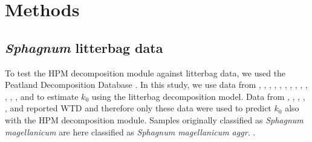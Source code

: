 \documentclass[esd, manuscript]{copernicus}
\begin{document}
\hypertarget{sdm-003-methods}{%
\section{Methods}\label{sdm-003-methods}}

\hypertarget{sdm-003-methods-1}{%
\subsection{\texorpdfstring{\emph{Sphagnum} litterbag data}{Sphagnum litterbag data}}\label{sdm-003-methods-1}}

To test the HPM decomposition module against litterbag data, we used the Peatland Decomposition Database \citep{Teickner.2024c}. In this study, we use data from \citet{Bartsch.1985}, \citet{Vitt.1990}, \citet{Johnson.1991}, \citet{Szumigalski.1996}, \citet{Prevost.1997}, \citet{Scheffer.2001}, \citet{Thormann.2001}, \citet{Asada.2005b}, \citet{Trinder.2008}, \citet{Breeuwer.2008}, \citet{Strakova.2010}, \citet{Hagemann.2015}, \citet{Golovatskaya.2017}, and \citet{Makila.2018} to estimate \(k_0\) using the litterbag decomposition model. Data from \citet{Johnson.1991}, \citet{Szumigalski.1996}, \citet{Prevost.1997}, \citet{Strakova.2010}, \citet{Golovatskaya.2017}, and \citet{Makila.2018} reported WTD and therefore only these data were used to predict \(k_0\) also with the HPM decomposition module. Samples originally classified as \emph{Sphagnum magellanicum} are here classified as \emph{Sphagnum magellanicum aggr.} \citep{Hassel.2018}.
\end{document}
